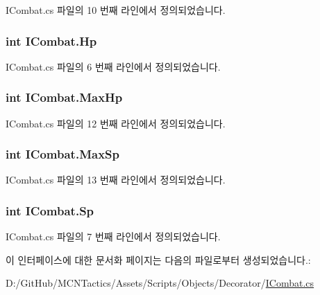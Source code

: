 I\+Combat.\+cs 파일의 10 번째 라인에서 정의되었습니다.

\subsubsection[{\texorpdfstring{Hp}{Hp}}]{\setlength{\rightskip}{0pt plus 5cm}int I\+Combat.\+Hp\hspace{0.3cm}{\ttfamily [get]}}\hypertarget{interface_i_combat_aa9d63fa3662b41ec000a73b9bfa663c4}{}\label{interface_i_combat_aa9d63fa3662b41ec000a73b9bfa663c4}


I\+Combat.\+cs 파일의 6 번째 라인에서 정의되었습니다.

\subsubsection[{\texorpdfstring{Max\+Hp}{MaxHp}}]{\setlength{\rightskip}{0pt plus 5cm}int I\+Combat.\+Max\+Hp\hspace{0.3cm}{\ttfamily [get]}}\hypertarget{interface_i_combat_a5c6ed297759d86d674077ee495226cc3}{}\label{interface_i_combat_a5c6ed297759d86d674077ee495226cc3}


I\+Combat.\+cs 파일의 12 번째 라인에서 정의되었습니다.

\subsubsection[{\texorpdfstring{Max\+Sp}{MaxSp}}]{\setlength{\rightskip}{0pt plus 5cm}int I\+Combat.\+Max\+Sp\hspace{0.3cm}{\ttfamily [get]}}\hypertarget{interface_i_combat_ab40a631d18b8bff65e84be84f0061708}{}\label{interface_i_combat_ab40a631d18b8bff65e84be84f0061708}


I\+Combat.\+cs 파일의 13 번째 라인에서 정의되었습니다.

\subsubsection[{\texorpdfstring{Sp}{Sp}}]{\setlength{\rightskip}{0pt plus 5cm}int I\+Combat.\+Sp\hspace{0.3cm}{\ttfamily [get]}}\hypertarget{interface_i_combat_a833ef74923f764476c432b48be18ac90}{}\label{interface_i_combat_a833ef74923f764476c432b48be18ac90}


I\+Combat.\+cs 파일의 7 번째 라인에서 정의되었습니다.



이 인터페이스에 대한 문서화 페이지는 다음의 파일로부터 생성되었습니다.\+:\begin{DoxyCompactItemize}
\item 
D\+:/\+Git\+Hub/\+M\+C\+N\+Tactics/\+Assets/\+Scripts/\+Objects/\+Decorator/\hyperlink{_i_combat_8cs}{I\+Combat.\+cs}\end{DoxyCompactItemize}
